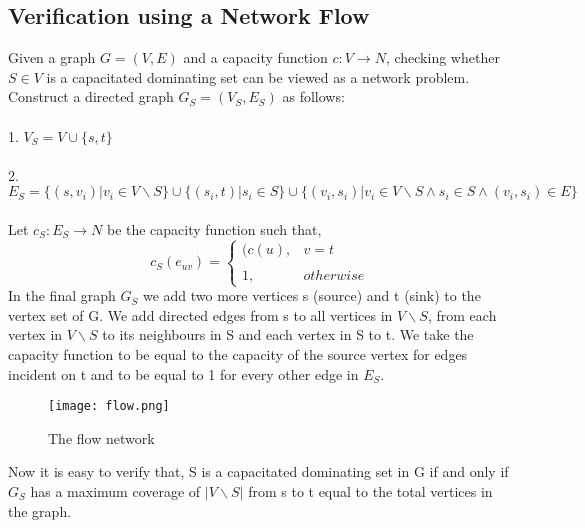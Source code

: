 \documentclass[12pt,a4paper,onecolumn]{article}
\begin{document}
\subsection{Verification using a Network Flow }
Given a graph $G = (V,E)$ and a capacity function $c : V \rightarrow N$, checking whether $S \in V$ is a capacitated dominating set can be viewed as a network problem. Construct a directed graph $G_S = (V_S,E_S)$ as follows:\\\\ 1. $V_S = V \cup \{s,t\}$\\\\ 2. $E_S = \{(s,v_i) | v_i \in V \backslash S \} \cup \{(s_i,t) | s_i \in S \}\cup \{(v_i,s_i) | v_i \in V \backslash S \wedge s_i \in S \wedge (v_i,s_i) \in E \}$\\\\ Let $c_S : E_S \rightarrow N$ be the capacity function such that, $$c_S(e_{uv}) =\left\{ \begin{array}{cc}(c(u),  &  v = t \\\\ 1, & otherwise \end{array}\right.$$
In the final graph $G_S$ we add two more vertices s (source) and t (sink) to the vertex set of G. We add directed edges from s to all vertices in $V \backslash S$, from each vertex in $V \backslash S$ to its neighbours in S and each vertex in S to t. We take the capacity function to be equal to the capacity of the source vertex for edges incident on t and to be equal to 1 for every other edge in $E_S$. \\
\begin{center}
 \begin{figure}[H]
 \begin{center}
 \texttt{[image: flow.png]}
 \end{center}
  \caption{The flow network}
  \label{Figure 1}
\end{figure}
 \end{center} Now it is easy to verify that, S is a capacitated dominating set in G if and only if $G_S$ has a maximum coverage of $|V \backslash S|$ from s to t equal to the total vertices in the graph. 
\end{document}
